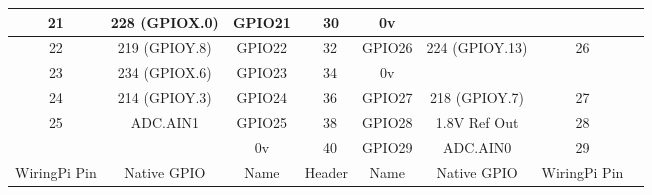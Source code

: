 \documentclass[11pt,a4paper]{article}
\begin{document}
\begin{sffamily}
\begin{center}
\begin{tabular}{|c|c|c||p{8mm}|p{8mm}||c|c|c|c|}
\hline
21	& 228 (GPIOX.0)		& \textcolor{rtb-green}{GPIO21}	& \raggedleft{29} & 30 & \textcolor{rtb-black}{0v}		&					& \\
\hline
22	& 219 (GPIOY.8)		& \textcolor{rtb-green}{GPIO22}	& \raggedleft{31} & 32 & \textcolor{rtb-green}{GPIO26}	& 224 (GPIOY.13)	& 26\\
\hline
23	& 234 (GPIOX.6)		& \textcolor{rtb-green}{GPIO23}	& \raggedleft{33} & 34 & \textcolor{rtb-black}{0v}		&					& \\
\hline
24	& 214 (GPIOY.3)		& \textcolor{rtb-green}{GPIO24}	& \raggedleft{35} & 36 & \textcolor{rtb-green}{GPIO27}	& 218 (GPIOY.7)		& 27\\
\hline
25	& ADC.AIN1			& \textcolor{rtb-green}{GPIO25}	& \raggedleft{37} & 38 & \textcolor{rtb-green}{GPIO28}	& 1.8V Ref Out		& 28\\
\hline
	& 					& \textcolor{rtb-black}{0v}		& \raggedleft{39} & 40 & \textcolor{rtb-green}{GPIO29}	& ADC.AIN0			& 29\\
\hline
\hline
WiringPi Pin	& Native GPIO	& Name	& \multicolumn{2}{|c||}{Header}	& Name	& Native GPIO	& WiringPi Pin\\
\hline
\end{tabular}
\end{center}

\end{sffamily}
\end{document}
